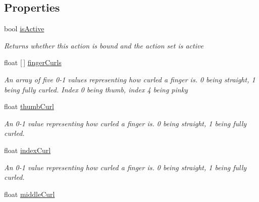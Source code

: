 \subsection*{Properties}
\begin{DoxyCompactItemize}
\item 
bool \mbox{\hyperlink{class_valve_1_1_v_r_1_1_steam_v_r___behaviour___skeleton_a10ebe2c1d0b54d1dbcec54bf0555ef5b}{is\+Active}}
\begin{DoxyCompactList}\small\item\em Returns whether this action is bound and the action set is active \end{DoxyCompactList}\item 
float \mbox{[}$\,$\mbox{]} \mbox{\hyperlink{class_valve_1_1_v_r_1_1_steam_v_r___behaviour___skeleton_aaf8a56b30ee0fdb3624f5d9749e27cea}{finger\+Curls}}
\begin{DoxyCompactList}\small\item\em An array of five 0-\/1 values representing how curled a finger is. 0 being straight, 1 being fully curled. Index 0 being thumb, index 4 being pinky \end{DoxyCompactList}\item 
float \mbox{\hyperlink{class_valve_1_1_v_r_1_1_steam_v_r___behaviour___skeleton_afdbc5c720567f8a20acb030108d59efa}{thumb\+Curl}}
\begin{DoxyCompactList}\small\item\em An 0-\/1 value representing how curled a finger is. 0 being straight, 1 being fully curled. \end{DoxyCompactList}\item 
float \mbox{\hyperlink{class_valve_1_1_v_r_1_1_steam_v_r___behaviour___skeleton_aade754ed570d7e41456f7deef4c63d64}{index\+Curl}}
\begin{DoxyCompactList}\small\item\em An 0-\/1 value representing how curled a finger is. 0 being straight, 1 being fully curled. \end{DoxyCompactList}\item 
float \mbox{\hyperlink{class_valve_1_1_v_r_1_1_steam_v_r___behaviour___skeleton_ada685dd77e3fcf0bf21647d898598672}{middle\+Curl}}

\end{DoxyCompactItemize}
